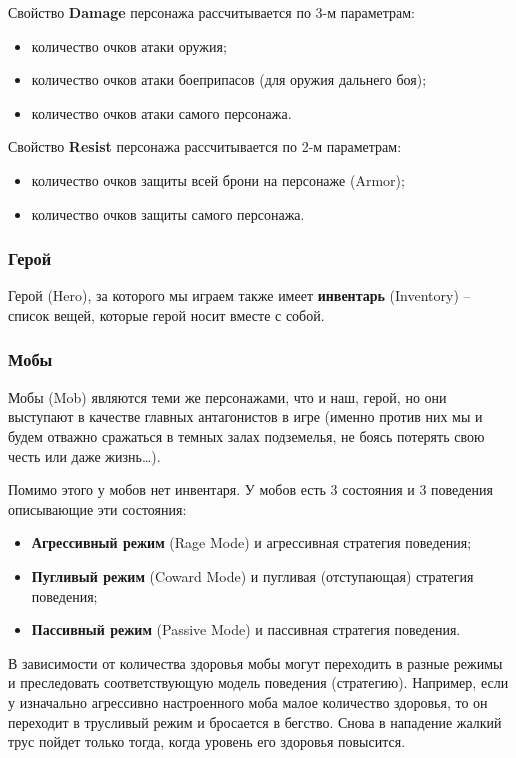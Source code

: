 \documentclass[a4paper,10pt]{article}
\begin{document}
Свойство \textbf{Damage} персонажа рассчитывается по 3-м параметрам: 

\begin{itemize}
    \item количество очков атаки оружия;
    \item количество очков атаки боеприпасов (для оружия дальнего боя);
    \item количество очков атаки самого персонажа.
\end{itemize}

Свойство \textbf{Resist} персонажа рассчитывается по 2-м параметрам:

\begin{itemize}
    \item количество очков защиты всей брони на персонаже (Armor);
    \item количество очков защиты самого персонажа.
\end{itemize}

\subsubsection*{Герой}

Герой (Hero), за которого мы играем также имеет \textbf{инвентарь} (Inventory) -- список вещей, которые герой носит вместе с собой. 

\subsubsection*{Мобы}

Мобы (Mob) являются теми же персонажами, что и наш, герой, но они выступают в качестве главных антагонистов в игре (именно против них мы и будем отважно сражаться в темных залах подземелья, не боясь потерять свою честь или даже жизнь\ldots).

Помимо этого у мобов нет инвентаря. У мобов есть 3 состояния и 3 поведения описывающие эти состояния:


\begin{itemize}
    \item \textbf{Агрессивный режим} (Rage Mode) и агрессивная стратегия поведения;
    \item \textbf{Пугливый режим} (Coward Mode) и пугливая (отступающая) стратегия поведения;
    \item \textbf{Пассивный режим} (Passive Mode) и пассивная стратегия поведения.
\end{itemize}

В зависимости от количества здоровья мобы могут переходить в разные режимы и преследовать соответствующую модель поведения (стратегию). Например, если у изначально агрессивно настроенного моба малое количество здоровья, то он переходит в трусливый режим и бросается в бегство. Снова в нападение жалкий трус пойдет только тогда, когда уровень его здоровья повысится. 
\end{document}
